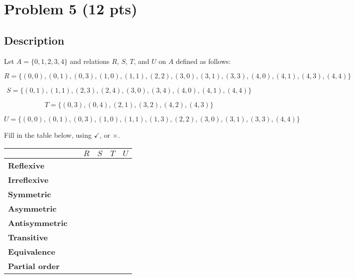 \newpage

\section{Problem 5 (12 pts)}
\subsection{Description}

\noindent Let $A = \{ 0, 1, 2, 3, 4 \}$ and relations $R$, $S$, $T$, and $U$ on $A$ defined as follows:

\[ R = \{ (0, 0),  (0, 1),  (0, 3),  (1, 0),  (1, 1),  (2, 2),  (3, 0),  (3, 1), (3, 3), (4, 0), (4, 1), (4, 3), (4, 4)  \}\]

\[ S = \{ (0, 1),  (1, 1),  (2, 3),  (2, 4), (3, 0), (3, 4), (4, 0), (4, 1), (4, 4)  \}\]

\[ T = \{ (0, 3), (0, 4),  (2, 1), (3, 2), (4, 2), (4, 3) \}\]

\[ U = \{ (0, 0),  (0, 1), (0, 3), (1, 0), (1, 1), (1, 3), (2, 2), (3, 0), (3, 1), (3, 3), (4, 4) \}\]

\noindent Fill in the table below, using $\checkmark$, or $\times$.

\begin{center}
\begin{tabular}{|l|l|l|l|l|l|}
\hline
						&	&	$R$	&	$S$	&	$T$	& $U$\\
\hline
\textbf{Reflexive} 	&   &		&		&	&	 \\
\hline
\textbf{Irreflexive} 	&   &		&		&	&	 \\
\hline
\textbf{Symmetric} 	&   &		&		&	&	 \\
\hline
\textbf{Asymmetric} 	&   &		&		&	&	 \\
\hline
\textbf{Antisymmetric} &   &		&		&	&	 \\
\hline
\textbf{Transitive} 	&   &		&		&	&	 \\
\hline
\textbf{Equivalence} 	&   &		&		&	&	 \\
\hline
\textbf{Partial order} 	&   &		&		&	&	 \\
\hline
\end{tabular}
\end{center}
